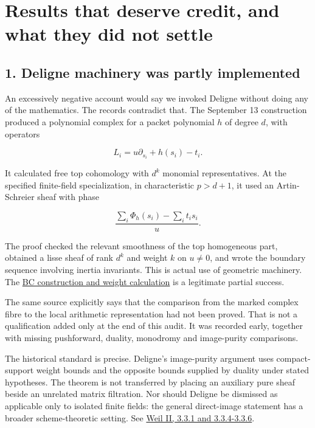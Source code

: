 \documentclass[
  british,
  11pt,
  a4paper,
]{article}
\begin{document}
\section{Results that deserve credit, and what they did not
settle}\label{results-that-deserve-credit-and-what-they-did-not-settle}

\subsection{1. Deligne machinery was partly
implemented}\label{deligne-machinery-was-partly-implemented}

An excessively negative account would say we invoked Deligne without
doing any of the mathematics. The records contradict that. The September
13 construction produced a polynomial complex for a packet polynomial
\(h\) of degree \(d\), with operators

\[L_i=u\partial_{s_i}+h(s_i)-t_i.\]

It calculated free top cohomology with \(d^k\) monomial representatives.
At the specified finite-field specialization, in characteristic
\(p>d+1\), it used an Artin-Schreier sheaf with phase

\[\frac{\sum_i\Phi_h(s_i)-\sum_i t_i s_i}{u}.\]

The proof checked the relevant smoothness of the top homogeneous part,
obtained a lisse sheaf of rank \(d^k\) and weight \(k\) on \(u\ne0\),
and wrote the boundary sequence involving inertia invariants. This is
actual use of geometric machinery. The
\href{https://github.com/KokunoYumeto/zeta-function-research-reader/blob/e1dc06aa68bb810cf7d8b0006942f5b036b8b765/workbenches/splitzero-tandem/continuations/20260913-accepted-followups/deligne-mixed-control/COMPLETE_CONTROL_WORK.tex\#L2229}{BC
construction and weight calculation} is a legitimate partial success.

The same source explicitly says that the comparison from the marked
complex fibre to the local arithmetic representation had not been
proved. That is not a qualification added only at the end of this audit.
It was recorded early, together with missing pushforward, duality,
monodromy and image-purity comparisons.

The historical standard is precise. Deligne's image-purity argument uses
compact-support weight bounds and the opposite bounds supplied by
duality under stated hypotheses. The theorem is not transferred by
placing an auxiliary pure sheaf beside an unrelated matrix filtration.
Nor should Deligne be dismissed as applicable only to isolated finite
fields: the general direct-image statement has a broader
scheme-theoretic setting. See
\href{https://www.numdam.org/item/PMIHES_1980__52__137_0/}{Weil II,
3.3.1 and 3.3.4-3.3.6}.
\end{document}

